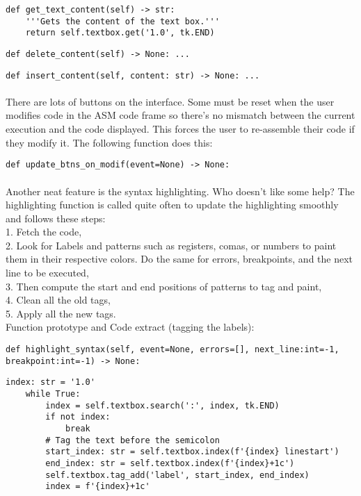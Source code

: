 \documentclass{article}
\begin{document}
\begin{lstlisting}[language=MyPython]
def get_text_content(self) -> str:
    '''Gets the content of the text box.'''
    return self.textbox.get('1.0', tk.END)
\end{lstlisting}
\begin{lstlisting}[language=MyPython]
def delete_content(self) -> None: ...
\end{lstlisting}
\begin{lstlisting}[language=MyPython]
def insert_content(self, content: str) -> None: ...
\end{lstlisting}
\paragraph{}

There are lots of buttons on the interface. Some must be reset when the user modifies code in the ASM code frame so there's no mismatch between the current execution and the code displayed. This forces the user to re-assemble their code if they modify it. The following function does this: \\

\begin{lstlisting}[language=MyPython]
def update_btns_on_modif(event=None) -> None:
\end{lstlisting}
\paragraph{}

Another neat feature is the syntax highlighting. Who doesn't like some help? The highlighting function is called quite often to update the highlighting smoothly and follows these steps: \\
1. Fetch the code, \\
2. Look for Labels and patterns such as registers, comas, or numbers to paint them in their respective colors. Do the same for errors, breakpoints, and the next line to be executed, \\
3. Then compute the start and end positions of patterns to tag and paint, \\
4. Clean all the old tags, \\
5. Apply all the new tags. \\
Function prototype and Code extract (tagging the labels): \\


\begin{lstlisting}[language=MyPython]
def highlight_syntax(self, event=None, errors=[], next_line:int=-1, breakpoint:int=-1) -> None:
\end{lstlisting}
\begin{lstlisting}[language=MyPython]
index: str = '1.0'
    while True:
        index = self.textbox.search(':', index, tk.END)
        if not index:
            break
        # Tag the text before the semicolon
        start_index: str = self.textbox.index(f'{index} linestart')
        end_index: str = self.textbox.index(f'{index}+1c')
        self.textbox.tag_add('label', start_index, end_index)
        index = f'{index}+1c'
\end{lstlisting}
\end{document}
